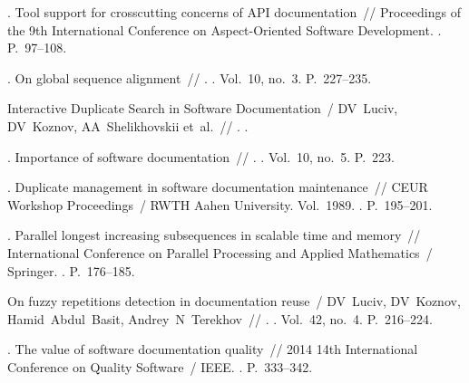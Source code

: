 \begin{thebibliography}{10}
. Tool support for crosscutting
  concerns of API documentation~// Proceedings of the 9th International
  Conference on Aspect-Oriented Software Development. \BibDash
{}. \BibDash
\newblock P.~97--108.

. On global sequence alignment~//
  . \BibDash
{}. \BibDash
\newblock Vol.~10, no.~3. \BibDash
\newblock P.~227--235.

Interactive Duplicate Search in Software Documentation~/ DV~Luciv, DV~Koznov,
  AA~Shelikhovskii et~al.~// .
  \BibDash
{}.

. Importance of software
  documentation~// . \BibDash
{}. \BibDash
\newblock Vol.~10, no.~5. \BibDash
\newblock P.~223.

. Duplicate management in software
  documentation maintenance~// CEUR Workshop Proceedings~/ RWTH Aahen
  University. \BibDash
\newblock Vol.~1989. \BibDash
{}. \BibDash
\newblock P.~195--201.

. Parallel longest increasing
  subsequences in scalable time and memory~// International Conference on
  Parallel Processing and Applied Mathematics~/ Springer. \BibDash
{}. \BibDash
\newblock P.~176--185.

On fuzzy repetitions detection in documentation reuse~/ DV~Luciv, DV~Koznov,
  Hamid~Abdul~Basit, Andrey~N~Terekhov~// . \BibDash
{}. \BibDash
\newblock Vol.~42, no.~4. \BibDash
\newblock P.~216--224.

. The value of
  software documentation quality~// 2014 14th International Conference on
  Quality Software~/ IEEE. \BibDash
{}. \BibDash
\newblock P.~333--342.


\end{thebibliography}
